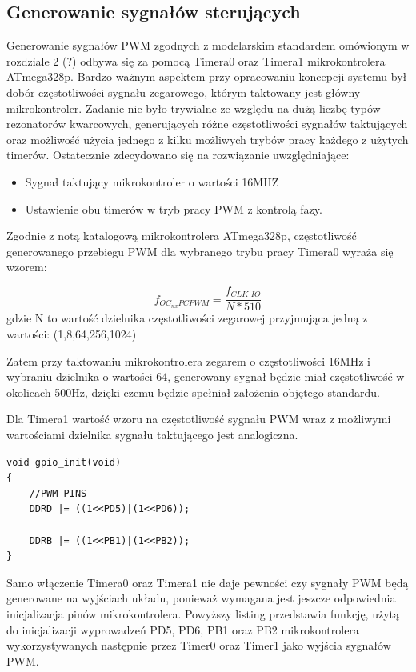 \subsection{Generowanie sygnałów sterujących}

Generowanie sygnałów PWM zgodnych z modelarskim standardem omówionym w rozdziale 2 (?) odbywa się za pomocą Timera0 oraz Timera1 mikrokontrolera ATmega328p. Bardzo ważnym aspektem przy opracowaniu koncepcji systemu był dobór częstotliwości sygnału zegarowego, którym taktowany jest główny mikrokontroler. Zadanie nie było trywialne ze względu na dużą liczbę typów rezonatorów kwarcowych, generujących różne częstotliwości sygnałów taktujących oraz możliwość użycia jednego z kilku możliwych trybów pracy każdego z użytych timerów. Ostatecznie zdecydowano się na rozwiązanie uwzględniające:
\begin{itemize}
	\item Sygnał taktujący mikrokontroler o wartości 16MHZ
	\item Ustawienie obu timerów w tryb pracy PWM z kontrolą fazy.
\end{itemize}

Zgodnie z notą katalogową mikrokontrolera ATmega328p, częstotliwość generowanego przebiegu PWM dla wybranego trybu pracy Timera0 wyraża się wzorem:

\begin{equation}
	f_{OC_{nx}PCPWM} = \frac{f_{CLK\_IO}}{N * 510}
\end{equation}
gdzie N to wartość dzielnika częstotliwości zegarowej przyjmująca jedną z wartości: (1,8,64,256,1024)
 
Zatem przy taktowaniu mikrokontrolera zegarem o częstotliwości 16MHz i wybraniu dzielnika o wartości 64, generowany sygnał będzie miał częstotliwość w okolicach 500Hz, dzięki czemu będzie spełniał założenia objętego standardu. 

Dla Timera1 wartość wzoru na częstotliwość sygnału PWM wraz z możliwymi wartościami dzielnika sygnału taktującego jest analogiczna.

\begin{lstlisting}
void gpio_init(void)
{
	//PWM PINS
	DDRD |= ((1<<PD5)|(1<<PD6));

	DDRB |= ((1<<PB1)|(1<<PB2));
}
\end{lstlisting}

Samo włączenie Timera0 oraz Timera1 nie daje pewności czy sygnały PWM będą generowane na wyjściach układu, ponieważ wymagana jest jeszcze odpowiednia inicjalizacja pinów mikrokontrolera. Powyższy listing przedstawia funkcję, użytą do inicjalizacji wyprowadzeń PD5, PD6, PB1 oraz PB2  mikrokontrolera wykorzystywanych następnie przez Timer0 oraz Timer1 jako wyjścia sygnałów PWM. 

